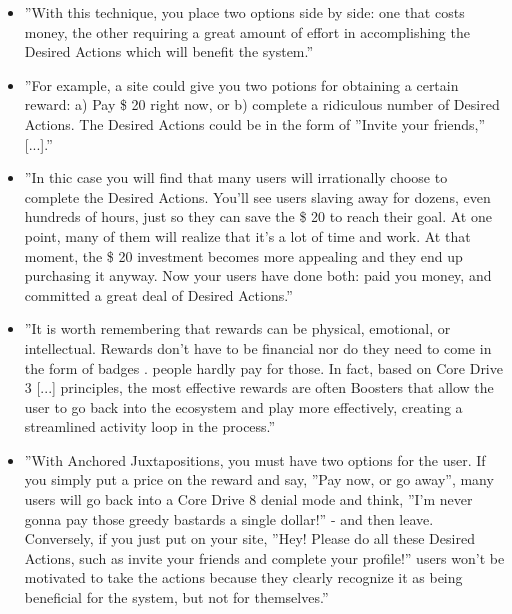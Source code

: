     \begin{itemize}
        \item ''With this technique, you place two options side by side: one that costs money, the other requiring a great amount of effort in accomplishing the Desired Actions which will benefit the system.''
        \item ''For example, a site could give you two potions for obtaining a certain reward: a) Pay \$ 20 right now, or b) complete a ridiculous number of Desired Actions. The Desired Actions could be in the form of ''Invite your friends,'' [...].''
        \item ''In thic case you will find that many users will irrationally choose to complete the Desired Actions. You'll see users slaving away for dozens, even hundreds of hours, just so they can save the \$ 20 to reach their goal. At one point, many of them will realize that it's a lot of time and work. At that moment, the \$ 20 investment becomes more appealing and they end up purchasing it anyway. Now your users have done both: paid you money, and committed a great deal of Desired Actions.''
        \item ''It is worth remembering that rewards can be physical, emotional, or intellectual. Rewards don't have to be financial nor do they need to come in the form of badges . people hardly pay for those. In fact, based on Core Drive 3 [...] principles, the most effective rewards are often Boosters that allow the user to go back into the ecosystem and play more effectively, creating a streamlined activity loop in the process.''
        \item ''With Anchored Juxtapositions, you must have two options for the user. If you simply put a price on the reward and say, ''Pay now, or go away'', many users will go back into a Core Drive 8 denial mode and think, ''I'm never gonna pay those greedy bastards a single dollar!'' - and then leave. Conversely, if you just put on your site, ''Hey! Please do all these Desired Actions, such as invite your friends and complete your profile!'' users won't be motivated to take the actions because they clearly recognize it as being beneficial for the system, but not for themselves.''
    \end{itemize}
    
